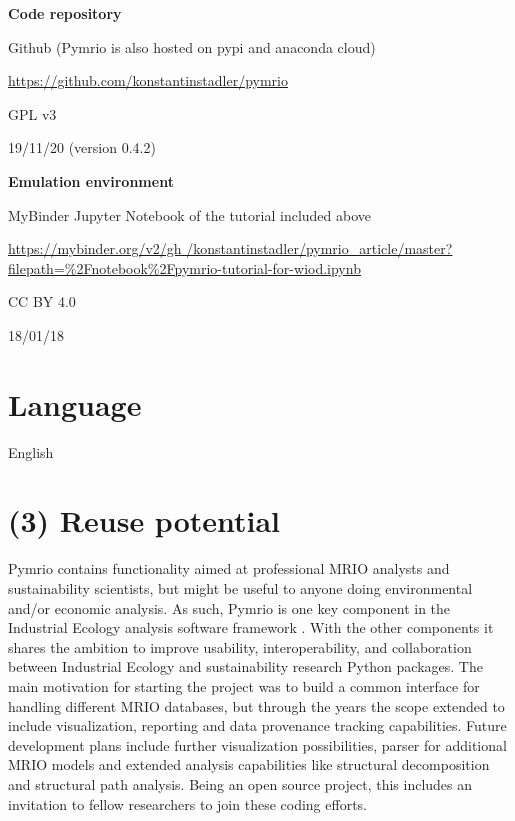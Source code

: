 \documentclass{jors}
\begin{document}
{\bf Code repository} 

\begin{description}[noitemsep,topsep=0pt]
    \item[Name:] Github (Pymrio is also hosted on pypi and anaconda cloud)
    \item[Persistent identifier:] \url{https://github.com/konstantinstadler/pymrio}
	\item[Licence:] GPL v3
    \item[Date published:] 19/11/20 (version 0.4.2)
\end{description}

{\bf Emulation environment} 

\begin{description}[noitemsep,topsep=0pt]
	\item[Name:] MyBinder Jupyter Notebook of the tutorial included above
    \item[Persistent identifier:] \url{https://mybinder.org/v2/gh /konstantinstadler/pymrio_article/master?filepath=%2Fnotebook%2Fpymrio-tutorial-for-wiod.ipynb}
        \item[Licence:] CC BY 4.0
	\item[Date published:] 18/01/18
\end{description}

\section*{Language}

English

\section*{(3) Reuse potential}

Pymrio contains functionality aimed at professional MRIO analysts and sustainability scientists, but might be useful to anyone doing environmental and/or economic analysis. 
As such, Pymrio is one key component in the Industrial Ecology analysis software framework \cite{pauliuk2015_Lifting}.
With the other components it shares the ambition to improve usability, interoperability, and collaboration between Industrial Ecology and sustainability research Python packages.
The main motivation for starting the project was to build a common interface for handling different MRIO databases, but through the years the scope extended to include visualization, reporting and data provenance tracking capabilities.
Future development plans include further visualization possibilities, parser for additional MRIO models and extended analysis capabilities like structural decomposition and structural path analysis.
Being an open source project, this includes an invitation to fellow researchers to join these coding efforts.
\end{document}
